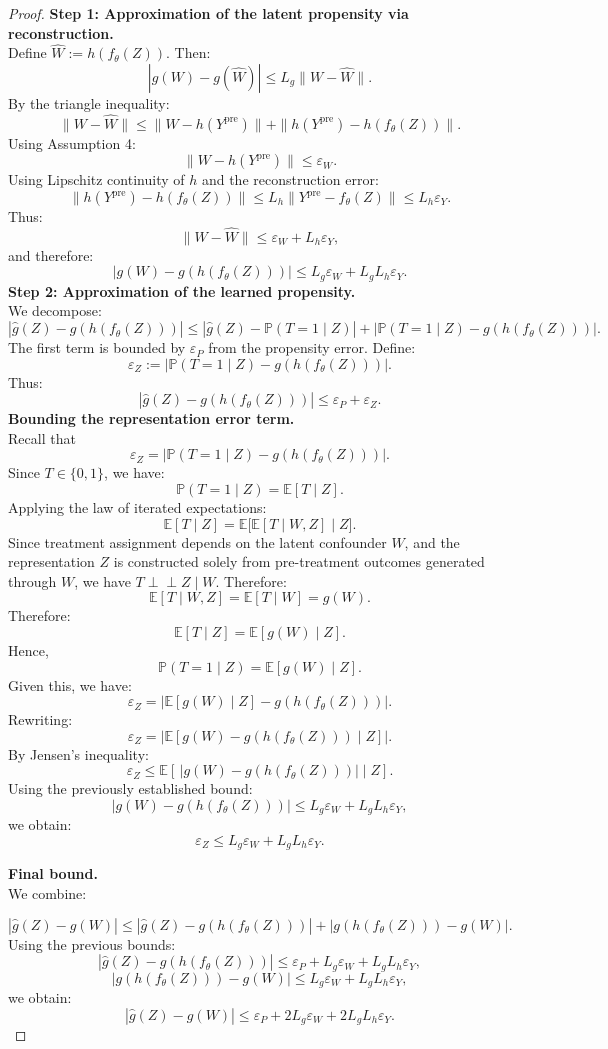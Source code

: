 \documentclass[10pt]{article} %
\begin{document}
\begin{proof}
\textbf{Step 1: Approximation of the latent propensity via reconstruction.}\\
Define $\hat W := h(f_\theta(Z))$. Then:
\[
|g(W) - g(\hat W)|
\le
L_g \|W - \hat W \|.
\]
By the triangle inequality:
\[
\|W - \hat W\|
\le
\|W- h(Y^{\mathrm{pre}})\|
+
\|h(Y^{\mathrm{pre}}) - h(f_\theta(Z))\|.
\]
Using Assumption 4:
\[
\|W - h(Y^{\mathrm{pre}})\| \le \varepsilon_W.
\]
Using Lipschitz continuity of $h$ and the reconstruction error:
\[
\|h(Y^{\mathrm{pre}}) - h(f_\theta(Z))\|
\le
L_h \|Y^{\mathrm{pre}} - f_\theta(Z)\|
\le
L_h \varepsilon_Y.
\]
Thus:
\[
\|W - \hat W\|
\le
\varepsilon_W + L_h \varepsilon_Y,
\]
and therefore:
\[
|g(W) - g(h(f_\theta(Z)))|
\le
L_g \varepsilon_W + L_g L_h \varepsilon_Y.
\]
\textbf{Step 2: Approximation of the learned propensity.}\\
We decompose:
\[
|\hat g(Z) - g(h(f_\theta(Z)))|
\le
|\hat g(Z) - \mathbb P(T=1 \mid Z)|
+
|\mathbb P(T=1 \mid Z) - g(h(f_\theta(Z)))|.
\]
The first term is bounded by $\varepsilon_P$ from the propensity error. Define:
\[
\varepsilon_Z := |\mathbb P(T=1 \mid Z) - g(h(f_\theta(Z)))|.
\]
Thus:
\[
|\hat g(Z) - g(h(f_\theta(Z)))|
\le
\varepsilon_P + \varepsilon_Z.
\]
\textbf{Bounding the representation error term.}\\
Recall that
\[
\varepsilon_Z
=
\left|\mathbb P(T=1 \mid Z) - g(h(f_\theta(Z)))\right|.
\]
Since $T \in \{0,1\}$, we have:
\[
\mathbb P(T=1 \mid Z) = \mathbb{E}[T \mid Z].
\]
Applying the law of iterated expectations:
\[
\mathbb{E}[T \mid Z]
=
\mathbb{E}\big[\mathbb{E}[T \mid W, Z] \mid Z\big].
\]
Since treatment assignment depends on the latent confounder \(W\), and the representation \(Z\) is constructed solely from pre-treatment outcomes generated through \(W\), we have \(T  \perp\!\!\!\perp Z \mid W\). Therefore:
\[
\mathbb{E}[T \mid W, Z] = \mathbb{E}[T \mid W] = g(W).
\]
Therefore:
\[
\mathbb{E}[T \mid Z]
=
\mathbb{E}[g(W) \mid Z].
\]
Hence,
\[
\mathbb P(T=1 \mid Z) = \mathbb{E}[g(W)\mid Z].
\]
Given this, we have:
\[
\varepsilon_Z
=
\left|\mathbb{E}[g(W)\mid Z] - g(h(f_\theta(Z)))\right|.
\]
Rewriting:
\[
\varepsilon_Z
=
\left|\mathbb{E}[g(W) - g(h(f_\theta(Z))) \mid Z]\right|.
\]
By Jensen's inequality:
\[
\varepsilon_Z
\le
\mathbb{E}\left[\,|g(W) - g(h(f_\theta(Z)))| \mid Z \right].
\]
Using the previously established bound:
\[
|g(W) - g(h(f_\theta(Z)))|
\le
L_g \varepsilon_W + L_g L_h \varepsilon_Y,
\]
we obtain:
\[
\varepsilon_Z
\le
L_g \varepsilon_W + L_g L_h \varepsilon_Y.
\]

\textbf{Final bound.} \\We combine:

\[
|\hat g(Z) - g(W)|
\le
|\hat g(Z) - g(h(f_\theta(Z)))|
+
|g(h(f_\theta(Z))) - g(W)|.
\]
Using the previous bounds:
\[
|\hat g(Z) - g(h(f_\theta(Z)))|
\le
\varepsilon_P + L_g \varepsilon_W + L_g L_h \varepsilon_Y,
\]
\[
|g(h(f_\theta(Z))) - g(W)|
\le
L_g \varepsilon_W + L_g L_h \varepsilon_Y,
\]
we obtain:
\[
|\hat g(Z) - g(W)|
\le
\varepsilon_P
+
2L_g \varepsilon_W
+
2L_g L_h \varepsilon_Y.
\]
\end{proof}
\end{document}
